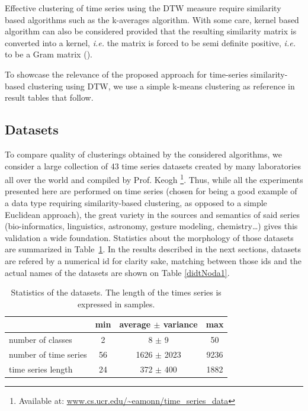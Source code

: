 \documentclass[10pt,journal,compsoc]{IEEEtran}
\begin{document}
Effective clustering of time series using the DTW measure require similarity based algorithms such as the k-averages algorithm. With some care, kernel based algorithm can also be considered provided that the resulting similarity matrix is converted into a kernel, \textit{i.e.} the matrix is forced to be semi definite positive, \textit{i.e.} to be a Gram matrix (\cite{Lanckriet:2004:LKM:1005332.1005334}).


To showcase the relevance of the proposed approach for time-series similarity-based clustering using DTW, we use a simple k-means clustering as reference in result tables that follow.

\subsection{Datasets}

To compare quality of clusterings obtained by the considered algorithms, we consider a large collection of 43 time series datasets created by many laboratories all over the world and compiled by Prof. Keogh \footnote{Available at: \url{www.cs.ucr.edu/~eamonn/time_series_data}}. Thus, while all the experiments presented here are performed on time series (chosen for being a good example of a data type requiring similarity-based clustering, as opposed to a simple Euclidean approach), the great variety in the sources and semantics of said series (bio-informatics, linguistics, astronomy, gesture modeling, chemistry\ldots{}) gives this validation a wide foundation. Statistics about the morphology of those datasets are summarized in Table~\ref{tab:dbs}. 
In the results described in the next sections, datasets are refered by a numerical id for clarity sake, matching between those ids and the actual names of the datasets are shown on Table \ref{didtNoda1}.

\begin{table}
\center
\caption{\label{tab:dbs} Statistics of the datasets. The length of the times series is expressed in samples.}
\begin{tabular}{l|ccc}
& min & average $\pm$ variance & max \\
\hline
number of classes & 2 & 8 $\pm$ 9 & 50 \\
number of time series & 56 & 1626 $\pm$ 2023 & 9236 \\
time series length & 24 & 372 $\pm$ 400 & 1882 \\
\end{tabular}
\end{table}
\end{document}
